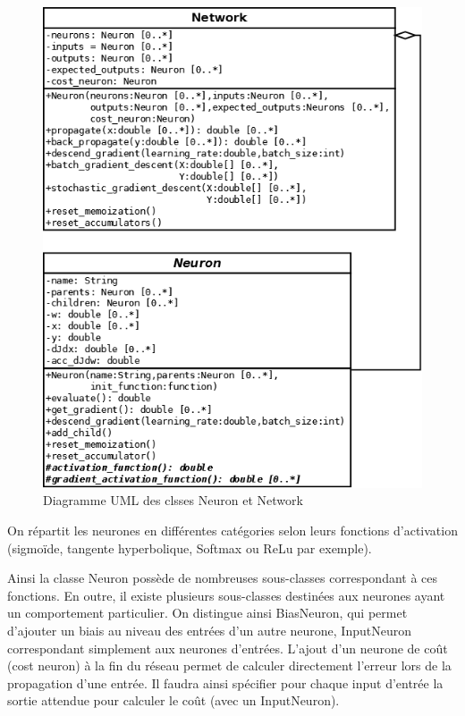 \begin{figure}
\begin{center}
\includegraphics[scale=0.3]{images/uml_simplifie_maispastrop_imp1.png}
\caption{Diagramme UML des clsses Neuron et Network}
\label{Diagramme UML des classes Neuron et Network}
\end{center}
\end{figure}

On répartit les neurones en différentes catégories selon leurs fonctions d'activation (sigmoïde, tangente hyperbolique, Softmax ou ReLu par exemple).

Ainsi la classe Neuron possède de nombreuses sous-classes correspondant à ces fonctions. En outre, il existe plusieurs sous-classes destinées aux neurones ayant un comportement particulier. On distingue ainsi BiasNeuron, qui permet d'ajouter un biais au niveau des entrées d'un autre neurone, InputNeuron correspondant simplement aux neurones d'entrées. L'ajout d'un neurone de coût (cost neuron) à la fin du réseau permet de calculer directement l'erreur lors de la propagation d'une entrée. Il faudra ainsi spécifier pour chaque input d'entrée la sortie attendue pour calculer le coût (avec un InputNeuron).

